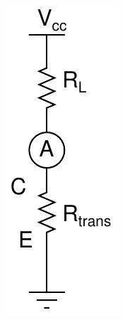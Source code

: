 \documentclass[beamer]{standalone}
\begin{document}
\begin{frame}
\begin{columns}[c]
\begin{column}{.6\textwidth}
		\end{column}
		\begin{column}{.25\textwidth}
			\begin{figure}
				\includegraphics[height=0.30\textheight]{./schematics/npn_constant_current_source_equivalent.pdf}
			\end{figure}
		\end{column}
	\end{columns}
\end{frame}
\end{document}
